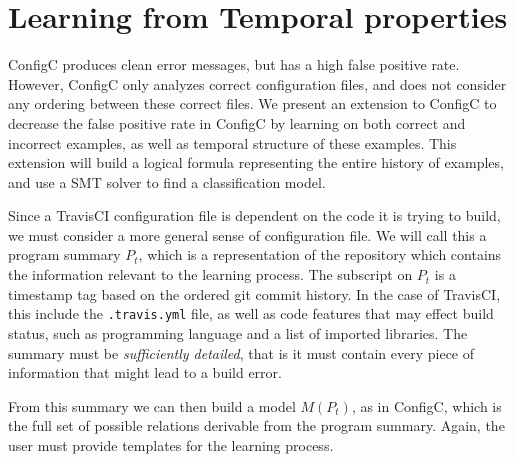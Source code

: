 \section{Learning from Temporal properties}


ConfigC produces clean error messages, but has a high false positive rate.
However, ConfigC only analyzes correct configuration files, and does not consider any ordering between these correct files.
We present an extension to ConfigC to decrease the false positive rate in ConfigC by learning on both correct and incorrect examples, as well as temporal structure of these examples.
This extension will build a logical formula representing the entire history of examples, and use a SMT solver to find a classification model.

Since a TravisCI configuration file is dependent on the code it is trying to build, we must consider a more general sense of configuration file.
We will call this a program summary $P_t$, which is a representation of the repository which contains the information relevant to the learning process.
The subscript on $P_t$ is a timestamp tag based on the ordered git commit history.
In the case of TravisCI, this include the \verb|.travis.yml| file, as well as code features that may effect build status, such as programming language and a list of imported libraries.
The summary must be \textit{sufficiently detailed}, that is it must contain every piece of information that might lead to a build error.


From this summary we can then build a model $M(P_t)$, as in ConfigC, which is the full set of possible relations derivable from the program summary.
Again, the user must provide templates for the learning process.

